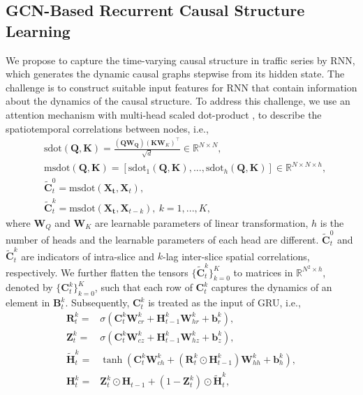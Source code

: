 \documentclass[letterpaper, 10 pt, conference]{ieeeconf}
\begin{document}
\subsection{GCN-Based Recurrent Causal Structure Learning}




We propose to capture the time-varying causal structure in traffic series by RNN, which generates the dynamic causal graphs stepwise from its hidden state. The challenge is to construct suitable input features for RNN that contain information about the dynamics of the causal structure. To address this challenge, we use an attention mechanism with multi-head scaled dot-product \cite{vaswani2017attention}, to describe the spatiotemporal correlations between nodes, i.e.,
\begin{equation}
        \begin{aligned}
                &\text{sdot}(\mathbf{Q}, \mathbf{K})=\frac{(\mathbf{Q}\mathbf{W_Q})(\mathbf{K}\mathbf{W}_K)^\top}{\sqrt{d}}\in\mathbb{R}^{N\times N},\\
                &\text{msdot}(\mathbf{Q}, \mathbf{K})=\left[\text{sdot}_1(\mathbf{Q}, \mathbf{K}),...,\text{sdot}_h(\mathbf{Q}, \mathbf{K})\right]\in\mathbb{R}^{N\times N\times h},\\
                &\tilde{\mathbf{C}}^0_t=\text{msdot}(\mathbf{X_t},\mathbf{X}_t),\\
                &\tilde{\mathbf{C}}^k_t=\text{msdot}(\mathbf{X_t},\mathbf{X}_{t-k}),\ k=1,...,K,
        \end{aligned}
\end{equation}
where $\mathbf{W}_Q$ and $\mathbf{W}_K$ are learnable parameters of linear transformation, $h$ is the number of heads and the learnable parameters of each head are different. $\tilde{\mathbf{C}}^0_t$ and $\tilde{\mathbf{C}}^k_t$ are indicators of intra-slice and $k$-lag inter-slice spatial correlations, respectively. We further flatten the tensors $\{\tilde{\mathbf{C}}_t^k\}_{k=0}^K$ to matrices in $\mathbb{R}^{N^2\times h}$, denoted by $\{\mathbf{C}_t^k\}_{k=0}^K$, such that each row of $\mathbf{C}_t^k$ captures the dynamics of an element in $\mathbf{B}_t^k$. Subsequently, $\mathbf{C}_t^k$ is treated as the input of GRU, i.e.,
\begin{equation}
        \begin{aligned}
                \mathbf{R}_t^k=&\sigma(\mathbf{C}_t^k\mathbf{W}_{cr}^{k}+\mathbf{H}_{t-1}^k\mathbf{W}_{hr}^{k}+\mathbf{b}_r^k),\\
                \mathbf{Z}_t^k=&\sigma(\mathbf{C}_t^k\mathbf{W}_{cz}^{k}+\mathbf{H}_{t-1}^k\mathbf{W}_{hz}^{k}+\mathbf{b}_z^k),\\
                \tilde{\mathbf{H}}_t^k=&\tanh(\mathbf{C}_t^k\mathbf{W}_{ch}^{k}+(\mathbf{R}_t^k\odot\mathbf{H}_{t-1}^k)\mathbf{W}_{hh}^{k}+\mathbf{b}_h^k),\\
                \mathbf{H}_t^k=&\mathbf{Z}_t^k\odot\mathbf{H}_{t-1}+(1-\mathbf{Z}_t^k)\odot\tilde{\mathbf{H}}_t^k,
        \end{aligned}
\end{equation}
\end{document}
